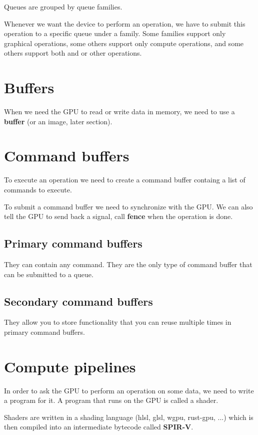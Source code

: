 \documentclass[a4paper]{article}
\begin{document}
Queues are grouped by queue families.

Whenever we want the device to perform an operation,
we have to submit this operation to a specific queue under a family.
Some families support only graphical operations,
some others support only compute operations, and some others support both
and or other operations.

\section{Buffers}

When we need the GPU to read or write data in memory,
we need to use a \textbf{buffer} (or an image, later section).

\section{Command buffers}

To execute an operation we need to create a command buffer
containg a list of commands to execute.

To submit a command buffer we need to synchronize with the GPU.
We can also tell the GPU to send back a signal, call \textbf{fence} when
the operation is done.

\subsection{Primary command buffers}

They can contain any command.
They are the only type of command buffer that can be submitted to a queue.

\subsection{Secondary command buffers}

They allow you to store functionality that you can reuse multiple times in primary command buffers. 

\section{Compute pipelines}

In order to ask the GPU to perform an operation on some data, we need to write
a program for it. A program that runs on the GPU is called a shader.

Shaders are written in a shading language (hlsl, glsl, wgpu, rust-gpu, ...)
which is then compiled into an intermediate bytecode called \textbf{SPIR-V}.
\end{document}
